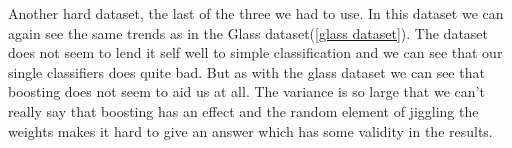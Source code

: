Another hard dataset, the last of the three we had to use. In this dataset we
can again see the same trends as in the Glass dataset(\ref{glass dataset}). The
dataset does not seem to lend it self well to simple classification and we can
see that our single classifiers does quite bad. But as with the glass dataset we
can see that boosting does not seem to aid us at all. The variance is so large
that we can't really say that boosting has an effect and the random element of
jiggling the weights makes it hard to give an answer which has some validity in
the results.

